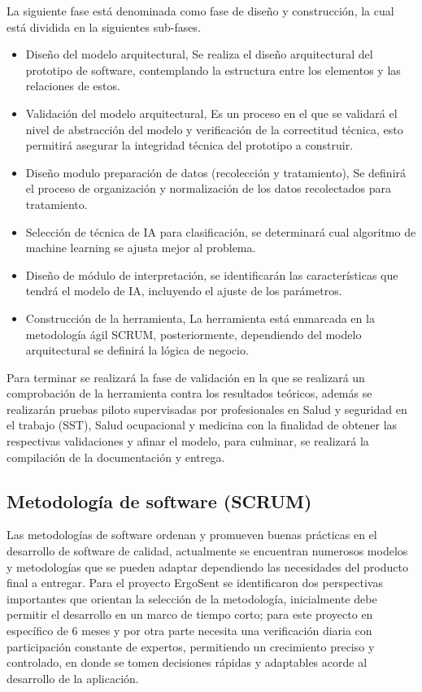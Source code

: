 La siguiente fase está denominada como fase de diseño y construcción, la cual está dividida en la siguientes sub-fases.
\begin{itemize}
\item Diseño del modelo arquitectural, Se realiza el diseño arquitectural del prototipo de software, contemplando la estructura entre los elementos y las relaciones de estos.
\item Validación del modelo arquitectural, Es un proceso en el que se validará el nivel de abstracción del modelo y verificación de la correctitud técnica, esto permitirá asegurar la integridad técnica del prototipo a construir.  
\item Diseño modulo preparación de datos (recolección y tratamiento), Se definirá el proceso de organización y normalización de los datos recolectados para tratamiento.
\item Selección de técnica de IA para clasificación, se determinará cual algoritmo de machine learning se ajusta mejor al problema.
\item Diseño de módulo de interpretación, se identificarán las características que tendrá el modelo de IA, incluyendo el ajuste de los parámetros.
\item Construcción de la herramienta, La herramienta está enmarcada en la metodología ágil SCRUM, posteriormente, dependiendo del modelo arquitectural se definirá la lógica de negocio.

\end{itemize}

Para terminar se realizará la fase de validación en la que se realizará un comprobación de la herramienta contra los resultados teóricos, además se realizarán pruebas piloto supervisadas por profesionales en Salud y seguridad en el trabajo (SST), Salud ocupacional y medicina con la finalidad de obtener las respectivas validaciones y afinar el modelo, para culminar, se realizará la compilación de la documentación y entrega.


\subsection{Metodología de software (SCRUM)}
Las metodologías de software ordenan y promueven buenas prácticas en el desarrollo de software de calidad, actualmente se encuentran numerosos modelos y metodologías que se pueden adaptar dependiendo las necesidades del producto final a entregar\parencite{Nohemy2015ESCOGERDECISION}. Para el proyecto ErgoSent se identificaron dos perspectivas importantes que orientan la selección de la metodología, inicialmente debe permitir el desarrollo en un marco de tiempo corto; para este proyecto en específico de 6 meses y por otra parte necesita una verificación diaria con participación constante de expertos, permitiendo un crecimiento preciso y controlado, en donde se tomen decisiones rápidas y adaptables acorde al desarrollo de la aplicación.



